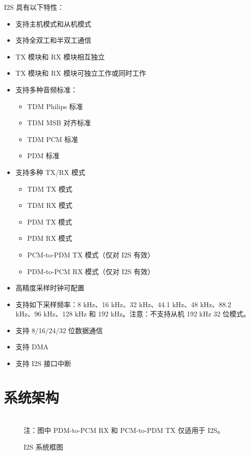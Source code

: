 \documentclass[main\_\_CN.tex]{subfiles}
\begin{document}
I2S 具有以下特性：
\begin{itemize}
    \item 支持主机模式和从机模式
    \item 支持全双工和半双工通信
    \item TX 模块和 RX 模块相互独立
    \item TX 模块和 RX 模块可独立工作或同时工作
    \item 支持多种音频标准：
    \begin{itemize}
        \item TDM Philips 标准
        \item TDM MSB 对齐标准
        \item TDM PCM 标准
        \item PDM 标准
    \end{itemize}
    \item 支持多种 TX/RX 模式
        \begin{itemize}
        \item TDM TX 模式
        \item TDM RX 模式
        \item PDM TX 模式
        \item PDM RX 模式
        \item PCM-to-PDM TX 模式（仅对 I2S 有效）
        \item PDM-to-PCM RX 模式（仅对 I2S 有效）
    \end{itemize}
    \item 高精度采样时钟可配置
    \item 支持如下采样频率：8 kHz、16 kHz、32 kHz、44.1 kHz、48 kHz、88.2 kHz、96 kHz、128 kHz 和 192 kHz。注意：不支持从机 192 kHz 32 位模式。
    \item 支持 8/16/24/32 位数据通信
    \item 支持 DMA
    \item 支持 I2S 接口中断
\end{itemize}
\section{系统架构}
\begin{figure}[H]
    \centering
    \\
    注：图中 PDM-to-PCM RX 和 PCM-to-PDM TX 仅适用于 I2S。
    \caption{\chipname{} I2S 系统框图}
    \label{Figure:i2s_arch}
\end{figure}
\end{document}
